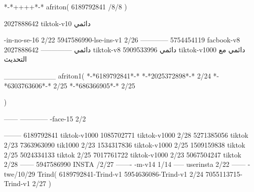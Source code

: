 *-*++++*-*
afriton(
6189792841 /8/8
)

2027888642 tiktok-v10
دائمي

-in-no-se-16 2/22
5947586990-lse-ins-v1 2/26
------------
5754454119 facbook-v8
دائمي
--------------
2027888642 tiktok-v8
دائمي
5909533996 tiktok-v1000
دائمي مع التحديث

__________
afriton1(
*-*6189792841*-*
*-*2025372898*-* 2/24
*-*6303763606*-* 2/25
*-*686366905*-* 2/25

)


------
------------
-face-15 2/2

--------
6189792841 tiktok-v1000
1085702771 tiktok-v1000 2/28
5271385056 tiktok 2/23
7363963090 tik1000 2/23
1534317836 tiktok-v1000 2/25
1509159838 tiktok 2/25
5024334133 tiktok 2/25
7017761722 tiktok-v1000 2/23
5067504247 tiktok 2/28
------
5947586990 INSTA /2/27
-------
-m-v14 1/14
-----
userinsta 2/22
------
-twe/10/29
Trind(
6189792841-Trind-v1 
5954636086-Trind-v1 2/24
7055113715-Trind-v1 2/27
)
